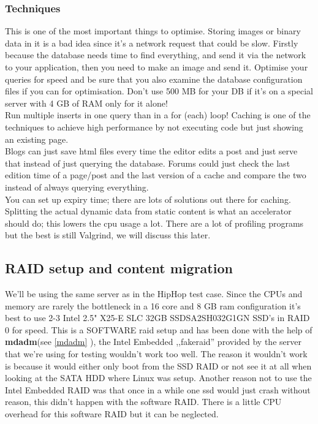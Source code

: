 \subsubsection{Techniques}
This is one of the most important things to optimise. Storing images or binary data in it is a bad idea since it's a network request that could be slow. Firstly because the database needs time to find everything, and send it via the network to your application, then you need to make an image and send it. Optimise your queries for speed and be sure that you also examine the database configuration files if you can for optimisation. Don't use 500 MB for your DB if it's on a special server with 4 GB of RAM only for it alone!
\\Run multiple inserts in one query than in a for (each) loop!
Caching is one of the techniques to achieve high performance by not executing code but just showing an existing page. 
\\Blogs can just save \gls{html} files every time the editor edits a post and just serve that instead of just querying the database. Forums could just check the last edition time of a page/post and the last version of a cache and compare the two instead of always querying everything. 
\\You can set up expiry time; there are lots of solutions out there for caching.
Splitting the actual dynamic data from static content is what an accelerator should do; this lowers the \gls{cpu} usage a lot.
There are a lot of profiling programs but the best is still Valgrind, we will discuss this later.
\subsection{RAID setup and content migration}
We'll be using the same server as in the HipHop test case.
Since the CPUs and memory are rarely the bottleneck in a 16 core and 8 GB \gls{ram} configuration it's best to use 2-3 Intel 2.5" X25-E SLC 32GB SSDSA2SH032G1GN SSD's in RAID 0 for speed. This is a SOFTWARE \gls{raid} setup and has been done with the help of \textbf{mdadm}(see \autoref{mdadm} ), the Intel Embedded ,,fakeraid'' provided by the server that we're using for testing wouldn't work too well. The reason it wouldn't work is because it would either only boot from the SSD RAID or not see it at all when looking at the SATA HDD where Linux was setup. 
Another reason not to use the Intel Embedded RAID was that once in a while one \gls{ssd} would just crash without reason, this didn't happen with the software RAID. There is a little CPU overhead for this software RAID but it can be neglected.

